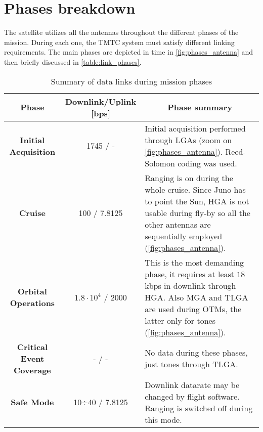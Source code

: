 \section{Phases breakdown}
\label{sec:phases_breakdown}

The satellite utilizes all the antennas throughout the different phases of the mission. During each one, the TMTC system must satisfy different linking requirements. The main phases are depicted in time in \autoref{fig:phases_antenna} and then briefly discussed in \autoref{table:link_phases}.


\begin{table}[H]
    \renewcommand{\arraystretch}{1.7}
    \centering
    \begin{tabularx}{\linewidth}{|c|c|X|}
        \hline
        \textbf{Phase} & \textbf{Downlink/Uplink [bps]} &  \multicolumn{1}{|c|}{\textbf{Phase summary}}  \\
        \hline
        \hline
        \textbf{Initial Acquisition} & 1745 / - & 
        Initial acquisition performed through LGAs \newline (zoom on \autoref{fig:phases_antenna}). Reed-Solomon coding was used. \\ 
        \hline
        \textbf{Cruise} & 100 / 7.8125 & 
        Ranging is on during the whole cruise. Since Juno has to point the Sun, HGA is not usable during fly-by so all the other antennas are sequentially employed (\autoref{fig:phases_antenna}). \\
        \hline
        \textbf{Orbital Operations} & $1.8 \cdot 10^{4} $ / 2000 & 
        This is the most demanding phase, it requires at least $18$ kbps in downlink through HGA. Also MGA and TLGA are used during OTMs, the latter only for tones (\autoref{fig:phases_antenna}). \\
        \hline
        \textbf{Critical Event Coverage} & - / - & No data during these phases, just tones through TLGA.\\
        \hline
        \textbf{Safe Mode} & 10$\div$40 / 7.8125 &
        Downlink datarate may be changed by flight software. Ranging is switched off during this mode. \\
        \hline
    \end{tabularx}
    \caption{Summary of data links during mission phases \cite{juno_telecommunication}}
    \label{table:link_phases}
\end{table}
